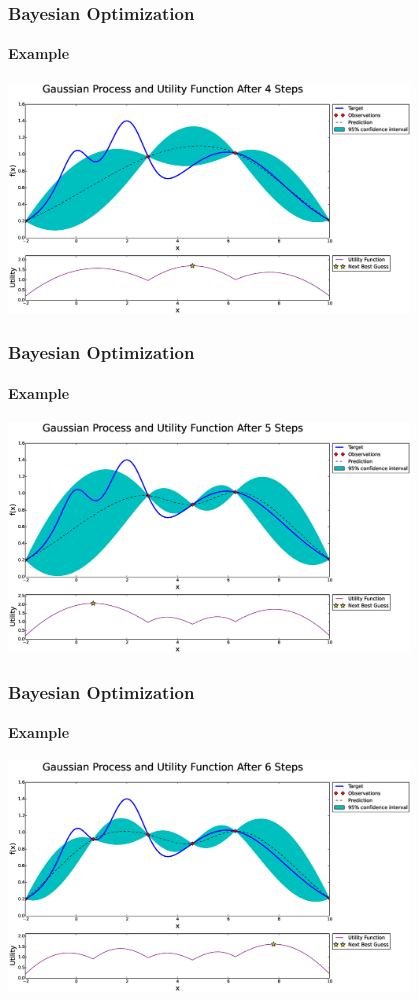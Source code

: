 \begin{frame}
	\frametitle{Bayesian Optimization}
	\framesubtitle{Example}
	
	\centering
	\includegraphics[width=0.8\textwidth]{figures/bayesian-optimization/fig2}
	
\end{frame}

\begin{frame}
	\frametitle{Bayesian Optimization}
	\framesubtitle{Example}
	
	\centering
	\includegraphics[width=0.8\textwidth]{figures/bayesian-optimization/fig3}
	
\end{frame}

\begin{frame}
	\frametitle{Bayesian Optimization}
	\framesubtitle{Example}
	
	\centering
	\includegraphics[width=0.8\textwidth]{figures/bayesian-optimization/fig4}
	
\end{frame}

